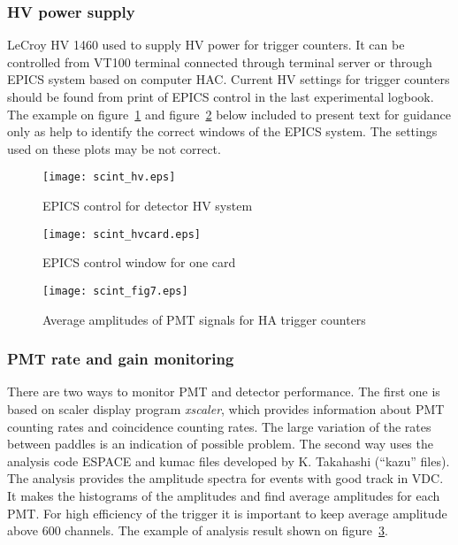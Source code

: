 \documentclass[12pt]{article}
\begin{document}
\subsubsection{HV power supply} 
LeCroy HV 1460 used to supply HV power for trigger counters. It can be controlled from 
VT100 terminal connected through terminal server or through EPICS system based on computer HAC. 
Current HV settings for trigger counters should be found from print of EPICS control in the 
last experimental logbook.   
The example on figure~\ref{HVwindowEPICS} and
figure~\ref{HVcardEPICS} below included to present text for guidance only as help to identify 
the correct windows of the EPICS system. The settings used on these plots may be not correct.

\begin{figure}
\begin{center}
\texttt{[image: scint\_hv.eps]}
{\linespread{1.}
\caption[HV control window]{EPICS control for detector HV system}
\label{HVwindowEPICS}}
\end{center}
\end{figure}

\begin{figure}
\begin{center}
\texttt{[image: scint\_hvcard.eps]}
{\linespread{1.}
\caption[HV control for one card]{EPICS control window for one card}
\label{HVcardEPICS}}
\end{center}
\end{figure}

\begin{figure}
\begin{center}
\texttt{[image: scint\_fig7.eps]}
{\linespread{1.}
\caption[Kazu results]{Average amplitudes of PMT signals for HA trigger counters}
\label{kazu_results}}
\end{center}
\end{figure}

\subsubsection{PMT rate and gain monitoring}
There are two ways to monitor PMT and detector performance. The first one is based on scaler 
display program {\it xscaler}, which provides information about PMT counting rates and 
coincidence counting rates.
The large variation of the rates between paddles is an indication of possible problem.
The second way uses the analysis code ESPACE and kumac files developed by K. Takahashi 
(``kazu'' files). The analysis provides the amplitude spectra for events with good track in VDC.
It makes the histograms of the amplitudes and find average amplitudes for each PMT. For high efficiency
of the trigger it is important to keep average amplitude above 600 channels. The example of
analysis result shown on figure~\ref{kazu_results}.
\end{document}
